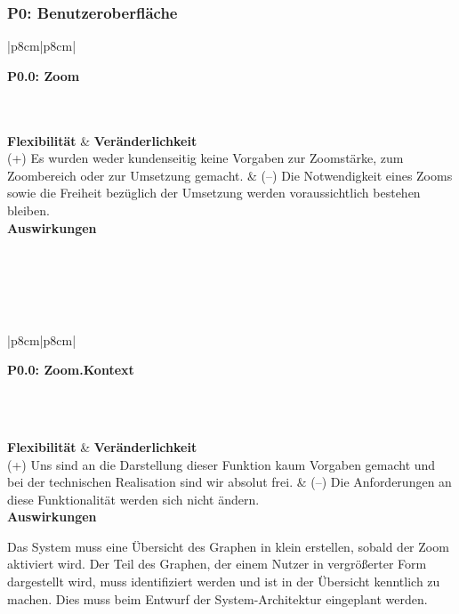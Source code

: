 \documentclass[enabledeprecatedfontcommands,fontsize=11pt,paper=a4,twoside]{scrartcl}
\newcounter{one}
\newcounter{two}[one]
\newcommand{\tone}{0\theone}
\newcommand{\one}{\stepcounter{one}0\theone}
\newcommand{\two}{\stepcounter{two}0\thetwo}
\newcommand\s{\rule{0pt}{4ex}}
\begin{document}
\newpage
\subsubsection*{\hypertarget{dd}{P\one}: Benutzeroberfläche}
\begin{tabular} {|p{8cm}|p{8cm}|}
	\hline
	 {\parbox{16cm}{\textbf{\hypertarget{ee}{P\tone.\two}: Zoom}} }\\ \hline\hline
	\\ \hline
	\textbf{Flexibilität}  & \textbf{Veränderlichkeit} \\
	(+) Es wurden weder kundenseitig keine Vorgaben zur Zoomstärke, zum Zoombereich oder zur Umsetzung gemacht. &
	(--) Die Notwendigkeit eines Zooms sowie die Freiheit bezüglich der Umsetzung werden voraussichtlich bestehen bleiben. \\ \hline
	 {\textbf{Auswirkungen}} \\
	\\ \hline
\end{tabular}
\\ \\ \\
\begin{tabular} {|p{8cm}|p{8cm}|}
	\hline
	 {\parbox{16cm}{\textbf{\hypertarget{ff}{P\tone.\two}: Zoom.Kontext}} }\\ \hline\hline
	 \s\\ [1ex] \hline
	\textbf{Flexibilität}  & \textbf{Veränderlichkeit} \\
	(+) Uns sind an die Darstellung dieser Funktion kaum Vorgaben gemacht und bei der technischen Realisation sind wir absolut frei. &
	(--) Die Anforderungen an diese Funktionalität werden sich nicht ändern. \\ \hline
	 {\textbf{Auswirkungen}} \\
	 {\parbox{16cm}{Das System muss eine Übersicht des Graphen in klein erstellen, sobald der Zoom aktiviert wird. Der Teil des Graphen, der einem Nutzer in vergrößerter Form dargestellt wird, muss identifiziert werden und ist in der Übersicht kenntlich zu machen. Dies muss beim Entwurf der System-Architektur eingeplant werden.} }\\ \hline
\end{tabular}
\end{document}
